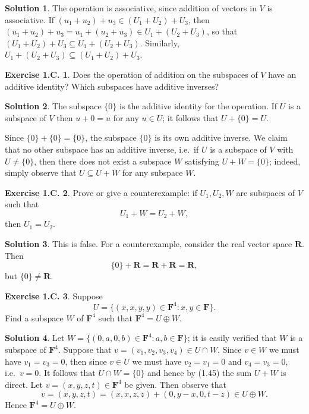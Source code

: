 \documentclass[12pt]{article}
\theoremstyle{definition}
\theoremstyle{exercise}
\newtheorem{exercise}{Exercise 1.C.}
\theoremstyle{solution}
\newtheorem*{solution}{Solution}
\newcommand{\R}{\mathbf{R}}
\newcommand{\F}{\mathbf{F}}
\begin{document}
\begin{solution}
    The operation is associative, since addition of vectors in \( V \) is associative. If \( (u_1 + u_2) + u_3 \in (U_1 + U_2) + U_3 \), then \( (u_1 + u_2) + u_3 = u_1 + (u_2 + u_3) \in U_1 + (U_2 + U_3) \), so that \( (U_1 + U_2) + U_3 \subseteq U_1 + (U_2 + U_3) \). Similarly, \( U_1 + (U_2 + U_3) \subseteq (U_1 + U_2) + U_3 \).
\end{solution}

\begin{exercise}
\label{ex:18}
    Does the operation of addition on the subspaces of \( V \) have an additive identity? Which subspaces have additive inverses?
\end{exercise}

\begin{solution}
    The subspace \( \{ 0 \} \) is the additive identity for the operation. If \( U \) is a subspace of \( V \) then \( u + 0 = u \) for any \( u \in U \); it follows that \( U + \{ 0 \} = U \).

    Since \( \{ 0 \} + \{ 0 \} = \{ 0 \} \), the subspace \( \{ 0 \} \) is its own additive inverse. We claim that no other subspace has an additive inverse, i.e.\ if \( U \) is a subspace of \( V \) with \( U \neq \{ 0 \} \), then there does not exist a subspace \( W \) satisfying \( U + W = \{ 0 \} \); indeed, simply observe that \( U \subseteq U + W \) for any subspace \( W \).
\end{solution}

\begin{exercise}
\label{ex:19}
    Prove or give a counterexample: if \( U_1, U_2, W \) are subspaces of \( V \) such that
    \[
        U_1 + W = U_2 + W,
    \]
    then \( U_1 = U_2 \).
\end{exercise}

\begin{solution}
    This is false. For a counterexample, consider the real vector space \( \R \). Then
    \[
        \{ 0 \} + \R = \R + \R = \R,
    \]
    but \( \{ 0 \} \neq \R \).
\end{solution}

\begin{exercise}
\label{ex:20}
    Suppose
    \[
        U = \{ (x, x, y, y) \in \F^4 : x, y \in \F \}.
    \]
    Find a subspace \( W \) of \( \F^4 \) such that \( \F^4 = U \oplus W \).
\end{exercise}

\begin{solution}
    Let \( W = \{ (0, a, 0, b) \in \F^4 : a, b \in \F \} \); it is easily verified that \( W \) is a subspace of \( \F^4 \). Suppose that \( v = (v_1, v_2, v_3, v_4) \in U \cap W \). Since \( v \in W \) we must have \( v_1 = v_3 = 0 \), then since \( v \in U \) we must have \( v_2 = v_1 = 0 \) and \( v_4 = v_3 = 0 \), i.e.\ \( v = 0 \). It follows that \( U \cap W = \{ 0 \} \) and hence by (1.45) the sum \( U + W \) is direct. Let \( v = (x, y, z, t) \in \F^4 \) be given. Then observe that
    \[
        v = (x, y, z, t) = (x, x, z, z) + (0, y - x, 0, t - z) \in U \oplus W.
    \]
    Hence \( \F^4 = U \oplus W \).
\end{solution}
\end{document}
